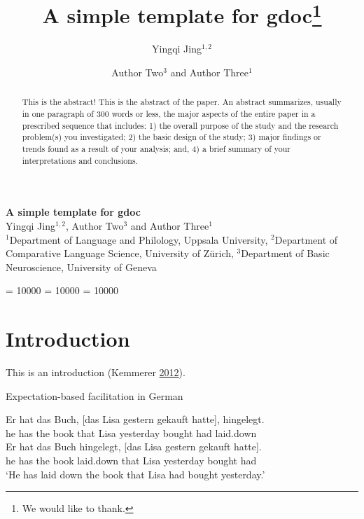 \documentclass[10pt,a4paper,]{article}
\title{A simple template for gdoc\thanks{We would like to thank.}}
\author{Yingqi Jing\(^{1,2}\) \and Author Two\(^3\) and Author Three\(^1\)}
\date{}
\let\eachwordone=\itshape
\let\eachwordtwo=\small
\def\gltoffset{0.5ex}
\begin{document}
\thispagestyle{empty}

\begin{center}
{\doublespacing
{\Large\sffamily\bfseries{A simple template for gdoc}}\\[6pt]

{\normalsize Yingqi Jing\(^{1,2}\), Author Two\(^3\) and Author Three\(^1\)}
\\ %
}
{\vspace{\baselineskip}\small \(^1\)Department of Language and Philology, Uppsala University, \(^2\)Department of Comparative Language Science, University of Zürich, \(^3\)Department of Basic Neuroscience, University of Geneva}



\end{center}
\vspace{6pt}


\vspace{\baselineskip}
\begin{abstract}
This is the abstract! This is the abstract of the paper. An abstract
summarizes, usually in one paragraph of 300 words or less, the major
aspects of the entire paper in a prescribed sequence that includes: 1)
the overall purpose of the study and the research problem(s) you
investigated; 2) the basic design of the study; 3) major findings or
trends found as a result of your analysis; and, 4) a brief summary of
your interpretations and conclusions.
\end{abstract}\vspace{2\baselineskip}

\setlength{\parskip}{4pt} \renewcommand{\labelitemi}{-} \clubpenalty =
10000 \widowpenalty = 10000 \displaywidowpenalty = 10000

\let\eachwordone=\itshape
\let\eachwordtwo=\small
\def\gltoffset{0.5ex}

\section{Introduction}\label{introduction}

This is an introduction (Kemmerer
\protect\hyperlink{ref-Kemmerer2012}{2012}).

\begin{exe} \ex Expectation-based facilitation in German \label{ex-german}
\begin{xlist}
\ex \gll Er hat das Buch, [das Lisa gestern gekauft hatte], hingelegt.\\
         he has the book that Lisa yesterday bought had laid.down\\
\ex  \gll Er hat das Buch hingelegt, [das Lisa gestern gekauft hatte].\\
        he has the book laid.down that Lisa yesterday bought had\\
       \glt ‘He has laid down the book that Lisa had bought yesterday.’ 
\end{xlist}
\end{exe}
\end{document}

